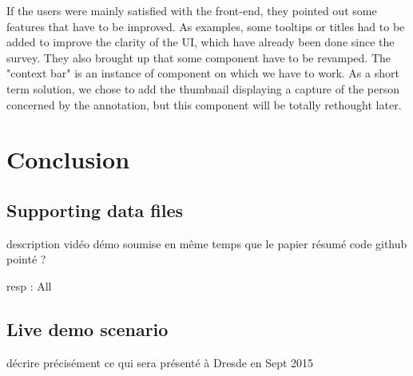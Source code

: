 \documentclass[a4paper]{article}
\begin{document}
If the users were mainly satisfied with the front-end, they pointed out some features that have to be improved. As examples, some tooltips or titles had to be added to improve the clarity of the UI, which have already been done since the survey. They also brought up that some component have to be revamped. The "context bar" is an instance of component on which we have to work. As a short term solution, we chose to add the thumbnail displaying a capture of the person concerned by the annotation, but this component will be totally rethought later.




  \section{Conclusion}
  
    \subsection{Supporting data files}

description vidéo démo soumise en même temps que le papier
résumé code github pointé ?    

resp : All

    \subsection{Live demo scenario}

décrire précisément ce qui sera présenté à Dresde en Sept 2015

  
  \newpage
  \eightpt
  
  
  
\end{document}

